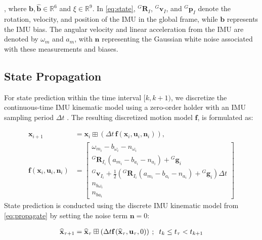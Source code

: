 \normalsize
, where $\mathbf {b}, \widehat{\mathbf {b}} \in \mathbb{R}^{6}$ and ${\xi} \in \mathbb{R}^{9}$. In \eqref{eq:state}, ${}^G\textbf{R}_{I}$, ${}^G\textbf{v}_{I}$, and ${}^G\textbf{p}_{I}$ denote the rotation, velocity, and position of the \ac{IMU} in the global frame, while $\textbf{b}$ represents the IMU bias. The angular velocity and linear acceleration from the \ac{IMU} are denoted by $\omega_m$ and $a_m$, with $\textbf{n}$ representing the Gaussian white noise associated with these measurements and biases.

\subsection{State Propagation}
\label{subsec: State Propagation}
For state prediction within the time interval $[k, k+1)$, we discretize the continuous-time \ac{IMU} kinematic model using a zero-order holder with an \ac{IMU} sampling period $\Delta t$ \cite{FAST-LIO}. The resulting discretized motion model \( \textbf{f} \), is formulated as:

\vspace{-5mm}\small
\begin{align}
\label{eq:propagate}
	\textbf{x}_{i+1} &= \textbf{x}_{i} \boxplus \left(\Delta t \, \textbf{f}\left(\textbf{x}_i, \textbf{u}_i, \textbf{n}_i\right)\right), \\
	\textbf{f}\left(\textbf{x}_i, \textbf{u}_i, \textbf{n}_i\right) &= \begin{bmatrix} 
    	\omega_{m_i} - b_{\omega_i} - n_{\omega_i} \\
    	{}^G\textbf{R}_{I_i} \left(a_{m_i} - b_{a_i} - n_{a_i}\right) + {}^G\textbf{g}_i \\
        {{}^G\textbf{v}}_{I_i} + \frac{1}{2}\left({}^G\textbf{R}_{I_i} \left(a_{m_i} - b_{a_i} - n_{a_i}\right) + {}^G\textbf{g}_i\right) \Delta t \nonumber \\
    	n_{b\omega_i} \\
    	n_{ba_i} 
    \end{bmatrix}
\end{align}
\normalsize
State prediction is conducted using the discrete \ac{IMU} kinematic model from \eqref{eq:propagate} by setting the noise term $\textbf{n}=0$:

\vspace{-3mm}\small
\begin{eqnarray}
\label{eq:state_predict}
\widehat{\textbf{x}}_{\tau+1} = \widehat{\textbf{x}}_{\tau} \boxplus \left(\Delta t \textbf{f}\left(\widehat{\textbf{x}}_\tau, \textbf{u}_\tau, 0\right)\right)\:;\;\;t_k \leq t_\tau <t_{k+1} 
\vspace{-1mm}
\end{eqnarray}
\normalsize



